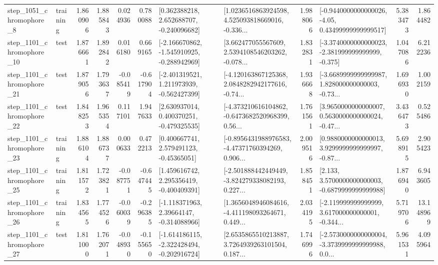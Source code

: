 \begin{tabular}{llrrrrllrlrr}
  step\_1051\_chromophore\_8 &  training &      1.860906 &    1.885843 &      0.024936 &  0.780088 &    [0.362388218, 2.652688707, -0.240096682] &  [1.0236516863924598, 4.525093818669016, -0.336... &       1.988066 &  [-0.9440000000000026, -4.05, 0.43499999999999517] &            5.383473 &          1.864482 \\
 step\_1101\_chromophore\_10 &      test &      1.876661 &    1.892842 &      0.016180 &  0.669165 &  [-2.166670862, -1.545910925, -0.288942969] &  [3.662477055567609, 2.5394108546203262, -0.078... &       1.832831 &  [-3.3740000000000023, -2.381999999999999, -0.375] &            1.047086 &          6.212236 \\
 step\_1101\_chromophore\_21 &      test &      1.879056 &    1.793637 &     -0.085419 & -0.617904 &   [-2.401319521, 1.211973939, -0.562427399] &  [-4.120163867125368, 2.0848282942177616, -0.74... &       1.936668 &  [-3.6689999999999987, 1.828000000000003, -0.73... &            1.696930 &          1.002159 \\
 step\_1101\_chromophore\_22 &      test &      1.848253 &    1.965354 &      0.117101 &  1.947633 &    [2.630937014, 0.400370251, -0.479325535] &  [-4.373210616104862, -0.6473682520968399, 0.56... &       1.761561 &  [3.9650000000000007, 0.5630000000000024, -0.47... &            3.436473 &          0.525486 \\
 step\_1101\_chromophore\_23 &  training &      1.886104 &    1.886737 &      0.000633 &  0.472213 &     [0.400667741, 2.579491123, -0.45365051] &  [-0.8956431988976583, -4.47371760394269, 0.906... &       2.009516 &  [0.9880000000000013, 3.9299999999999997, -0.87... &            5.698915 &          2.905423 \\
 step\_1101\_chromophore\_25 &  training &      1.811572 &    1.723821 &     -0.087751 & -0.647445 &    [1.459616742, 2.295356419, -0.400409391] &  [-2.501888442449449, -3.824279338082193, 0.227... &       1.858451 &   [2.133, 3.5700000000000003, -0.6879999999999988] &            1.876940 &          6.943605 \\
 step\_1101\_chromophore\_26 &  training &      1.834565 &    1.774526 &     -0.060039 & -0.296385 &    [-1.118371963, 2.39664147, -0.314088966] &  [1.3656048946084616, -4.411198093264671, 0.449... &       2.034195 &  [-2.119999999999999, 3.617000000000001, -0.344... &            5.719706 &         13.148969 \\
 step\_1101\_chromophore\_27 &      test &      1.811000 &    1.762071 &     -0.048930 & -0.155650 &  [-1.614186115, -2.322428494, -0.202916724] &  [2.6535865510213887, 3.7264939263101504, 0.187... &       1.746996 &  [-2.5730000000000004, -3.3739999999999988, 0.0... &            5.961531 &          4.095964 \\

\end{tabular}
